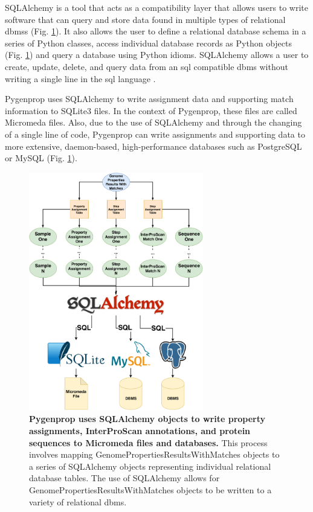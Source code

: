 SQLAlchemy \cite{bayer2014sqlalchemy} is a tool that acts as a compatibility layer that allows users to write software that can query and store data found in multiple types of relational \gls{dbms}s (Fig. \ref{fig:sqlalchemy}). It also allows the user to define a relational database schema in a series of Python classes, access individual database records as Python objects (Fig. \ref{fig:sqlalchemy}) and query a database using Python idioms. SQLAlchemy allows a user to create, update, delete, and query data from an \gls{sql} compatible \gls{dbms} without writing a single line in the \gls{sql} language \cite{bayer2014sqlalchemy}.

Pygenprop uses SQLAlchemy to write assignment data and supporting match information to SQLite3 files. In the context of Pygenprop, these files are called Micromeda files. Also, due to the use of SQLAlchemy and through the changing of a single line of code, Pygenprop can write assignments and supporting data to more extensive, daemon-based, high-performance databases such as PostgreSQL or MySQL (Fig. \ref{fig:sqlalchemy}).

\begin{figure}[!ht]
  \centering
	\includegraphics[width=0.68\textwidth]{media/SQLAlchemy.pdf}
	 \caption[Pygenprop uses SQLAlchemy objects to write property assignments, InterProScan annotations, and protein sequences to Micromeda files and databases.]{\textbf{Pygenprop uses SQLAlchemy objects to write property assignments, InterProScan annotations, and protein sequences to Micromeda files and databases.} This process involves mapping GenomePropertiesResultsWithMatches objects to a series of SQLAlchemy objects representing individual relational database tables. The use of SQLAlchemy allows for GenomePropertiesResultsWithMatches objects to be written to a variety of relational \gls{dbms}.} 
	 \label{fig:sqlalchemy}
\end{figure}


